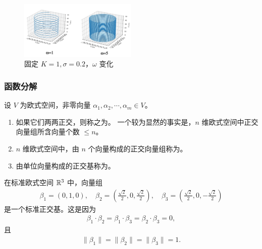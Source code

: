 \begin{property}[复指数信号与正余弦信号之间的关系]
\begin{figure}[H]
        \label{fig:complex-exponential-signal-sigma-vary}
    \end{figure}
    \begin{figure}[H]
        \centering
        \includegraphics[width=0.5\textwidth]{chap1/img/complex-exponential-signal-omega-vary.png}
        \caption{固定 $K = 1, \sigma = 0.2$，$\omega$ 变化}
        \label{fig:complex-exponential-signal-omega-vary}
    \end{figure}
\end{property}

\subsubsection{函数分解}

\begin{definition}[正交基]
    设 $V$ 为欧式空间，非零向量 $\alpha_1, \alpha_2, \cdots, \alpha_m \in V$。
    \begin{enumerate}
        \item 如果它们两两正交，则称之为。
            一个较为显然的事实是，$n$ 维欧式空间中正交向量组所含向量个数 $\le n$。
        \item $n$ 维欧式空间中，由 $n$ 个向量构成的正交向量组称为。
        \item 由单位向量构成的正交基称为。
    \end{enumerate}
\end{definition}

\begin{example}
    在标准欧式空间 $\mathbb{R}^3$ 中，向量组
    \begin{align*}
        \beta_1 = (0, 1, 0),
        \quad \beta_2 = (\frac{\sqrt{2}}{2}, 0, \frac{\sqrt{2}}{2}),
        \quad \beta_3 = (\frac{\sqrt{2}}{2}, 0, -\frac{\sqrt{2}}{2})
    \end{align*}
    是一个标准正交基。这是因为
    \begin{align*}
        \beta_1 \cdot \beta_2 = \beta_1 \cdot \beta_3 = \beta_2 \cdot \beta_3 = 0,
    \end{align*}
    且
    \begin{align*}
        \|\beta_1\| = \|\beta_2\| = \|\beta_3\| = 1.
    \end{align*}
\end{example}

